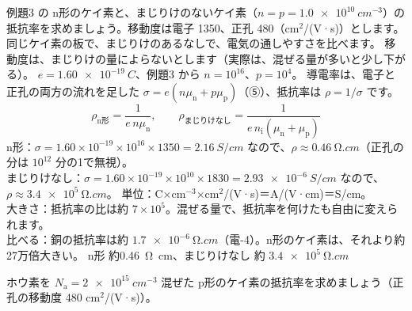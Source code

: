 \label{ph:原-9:ex4}
\begin{phreidai}[混ぜると抵抗率が何けたも変わる]
例題3 の n形のケイ素と、まじりけのないケイ素（$n=p=\qty{1.0e10}{cm^{-3}}$）の抵抗率を求めましょう。移動度は電子 1350、正孔 480（cm$^2$/(V·s)）とします。
\phbamen
同じケイ素の板で、まじりけのあるなしで、電気の通しやすさを比べます。
\phmushi
移動度は、まじりけの量によらないとします（実際は、混ぜる量が多いと少し下がる）。
\phzu
$e=\qty{1.60e-19}{C}$、例題3 から $n=10^{16}$、$p=10^4$。
\phriyu
導電率は、電子と正孔の両方の流れを足した $\sigma=e(n\mu_{\mathrm n}+p\mu_{\mathrm p})$（⑤）、抵抗率は $\rho=1/\sigma$ です。
\phtateru
\[ \rho_{\mathrm n形}=\frac{1}{e\,n\mu_{\mathrm n}},\qquad \rho_{\text{まじりけなし}}=\frac{1}{e\,n_{\mathrm i}(\mu_{\mathrm n}+\mu_{\mathrm p})} \]
\phtoku
n形：$\sigma=1.60\times10^{-19}\times10^{16}\times1350=\qty{2.16}{S/cm}$ なので、$\rho\approx\qty{0.46}{\ohm.cm}$（正孔の分は $10^{12}$ 分の1で無視）。\\
まじりけなし：$\sigma=1.60\times10^{-19}\times10^{10}\times1830=\qty{2.93e-6}{S/cm}$ なので、$\rho\approx\qty{3.4e5}{\ohm.cm}$。
\phtashikame
単位：C×cm$^{-3}$×cm$^2$/(V·s)＝A/(V·cm)＝S/cm。\\
大きさ：抵抗率の比は約 $7\times10^5$。混ぜる量で、抵抗率を何けたも自由に変えられます。\\
比べる：銅の抵抗率は約 $\qty{1.7e-6}{\ohm.cm}$（電-4）。n形のケイ素は、それより約27万倍大きい。
\kotae n形 約\qty{0.46}{\ohm.cm}、まじりけなし 約 $\qty{3.4e5}{\ohm.cm}$
\end{phreidai}
\begin{jibun}
ホウ素を $N_{\mathrm a}=\qty{2e15}{cm^{-3}}$ 混ぜた p形のケイ素の抵抗率を求めましょう（正孔の移動度 480 cm$^2$/(V·s)）。
\end{jibun}

